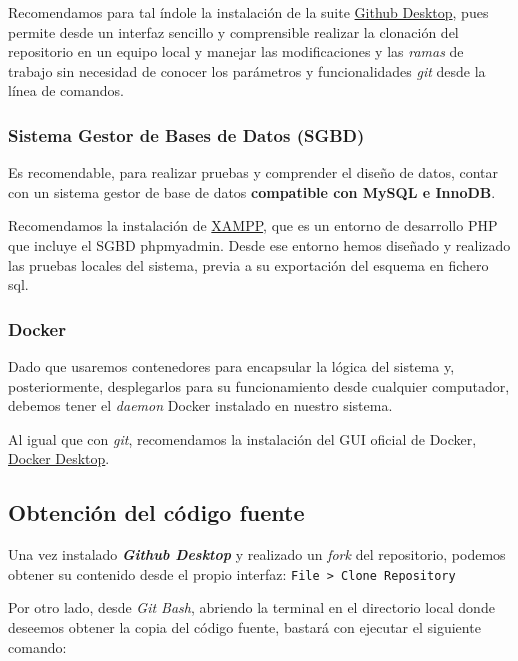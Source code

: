 Recomendamos para tal índole la instalación de la suite \href{https://docs.github.com/en/desktop/installing-and-configuring-github-desktop/installing-and-authenticating-to-github-desktop/installing-github-desktop}{Github Desktop}, pues permite desde un interfaz sencillo y comprensible realizar la clonación del repositorio en un equipo local y manejar las modificaciones y las \textit{ramas} de trabajo sin necesidad de conocer los parámetros y funcionalidades \textit{git} desde la línea de comandos.

\subsubsection{Sistema Gestor de Bases de Datos (SGBD)}

Es recomendable, para realizar pruebas y comprender el diseño de datos, contar con un sistema gestor de base de datos \textbf{compatible con MySQL e InnoDB}.

Recomendamos la instalación de \href{https://www.apachefriends.org/es/index.html}{XAMPP}, que es un entorno de desarrollo PHP que incluye el SGBD phpmyadmin. Desde ese entorno hemos diseñado y realizado las pruebas locales del sistema, previa a su exportación del esquema en fichero sql.

\subsubsection{Docker}

Dado que usaremos contenedores para encapsular la lógica del sistema y, posteriormente, desplegarlos para su funcionamiento desde cualquier computador, debemos tener el \textit{daemon} Docker instalado en nuestro sistema.

Al igual que con \textit{git}, recomendamos la instalación del GUI oficial de Docker, \href{https://docs.docker.com/desktop/install/windows-install/}{Docker Desktop}. 


\subsection{Obtención del código fuente}

Una vez instalado \textit{\textbf{Github Desktop}} y realizado un \textit{fork} del repositorio, podemos obtener su contenido desde el propio interfaz: \texttt{File > Clone Repository}


Por otro lado, desde \textit{Git Bash}, abriendo la terminal en el directorio local donde deseemos obtener la copia del código fuente, bastará con ejecutar el siguiente comando:

